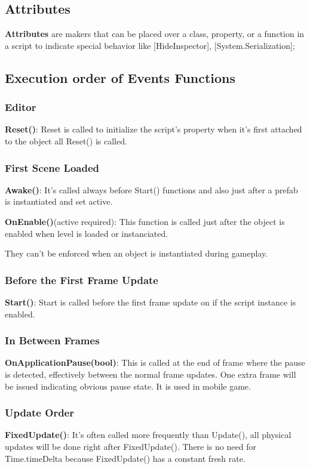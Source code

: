 \documentclass[10pt, a4paper]{article}
\begin{document}
        \subsection{Attributes}
            \textbf{Attributes} are makers that can be placed over a class, property, or a function in a script to indicate special behavior like [HideInspector], [System.Serialization];
        \subsection{Execution order of Events Functions}
            \subsubsection{Editor}
                \textbf{Reset()}: Reset is called to initialize the script's property when it's first attached to the object all Reset() is called. 
            \subsubsection{First Scene Loaded}
                \textbf{Awake()}: It's called always before Start() functions and also just after a prefab is instantiated and set active.

                \textbf{OnEnable()}(active required): This function is called just after the object is enabled when level is loaded or instanciated. 

                They can't be enforced when an object is instantiated during gameplay. 
            \subsubsection{Before the First Frame Update}
                \textbf{Start()}: Start is called before the first frame update on if the script instance is enabled. 
                
            \subsubsection{In Between Frames}
                \textbf{OnApplicationPause(bool)}: This is called at the end of frame where the pause is detected, effectively between the normal frame updates. One extra frame will be issued indicating obvious pause state. It is used in mobile game. 
            \subsubsection{Update Order}
                \textbf{FixedUpdate()}: It's often called more frequently than Update(), all physical updates will be done right after FixedUpdate(). There is no need for Time.timeDelta because FixedUpdate() has a constant fresh rate. 
\end{document}
